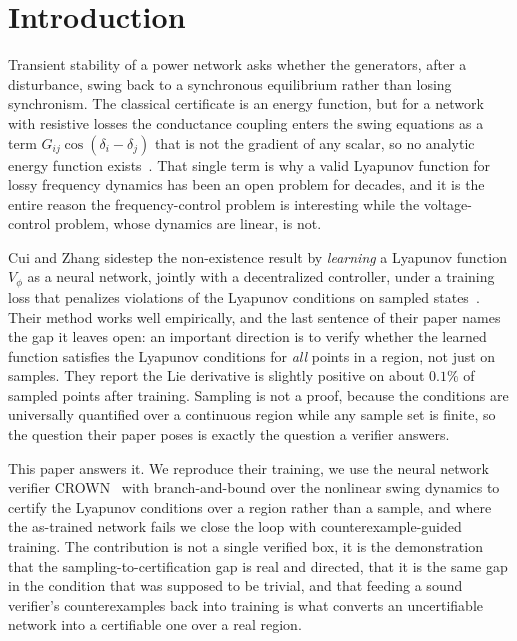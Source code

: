 \documentclass[letterpaper,journal]{IEEEtran}
\begin{document}
\section{Introduction}
Transient stability of a power network asks whether the generators, after a
disturbance, swing back to a synchronous equilibrium rather than losing
synchronism. The classical certificate is an energy function, but for a network
with resistive losses the conductance coupling enters the swing equations as a
term $G_{ij}\cos(\delta_i-\delta_j)$ that is not the gradient of any scalar, so
no analytic energy function exists~\cite{chiang1989energy}. That single term is
why a valid Lyapunov function for lossy frequency dynamics has been an open
problem for decades, and it is the entire reason the frequency-control problem is
interesting while the voltage-control problem, whose dynamics are linear, is not.

Cui and Zhang sidestep the non-existence result by \emph{learning} a Lyapunov
function $V_\phi$ as a neural network, jointly with a decentralized controller,
under a training loss that penalizes violations of the Lyapunov conditions on
sampled states~\cite{cui2022lyapunov}. Their method works well empirically, and
the last sentence of their paper names the gap it leaves open: an important
direction is to verify whether the learned function satisfies the Lyapunov
conditions for \emph{all} points in a region, not just on samples. They report the
Lie derivative is slightly positive on about $0.1\%$ of sampled points after
training. Sampling is not a proof, because the conditions are universally
quantified over a continuous region while any sample set is finite, so the
question their paper poses is exactly the question a verifier answers.

This paper answers it. We reproduce their training, we use the neural network
verifier CROWN~\cite{zhang2018crown} with branch-and-bound over the nonlinear
swing dynamics to certify the Lyapunov conditions over a region rather than a
sample, and where the as-trained network fails we close the loop with
counterexample-guided training. The contribution is not a single verified box, it
is the demonstration that the sampling-to-certification gap is real and directed,
that it is the same gap in the condition that was supposed to be trivial, and that
feeding a sound verifier's counterexamples back into training is what converts an
uncertifiable network into a certifiable one over a real region.
\end{document}
